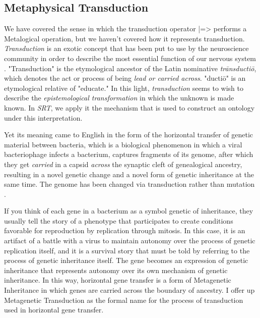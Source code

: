 \documentclass[runningheads]{llncs}
\begin{document}

\subsection{Metaphysical Transduction}

We have covered the sense in which the transduction operator |=> performs a Metalogical operation, but we haven't covered how it represents transduction. \emph{Transduction} is an exotic concept that has been put to use by the neuroscience community in order to describe the most essential function of our nervous system \cite{Hagins1970}. "Transduction" is the etymological ancestor of the Latin nominative \emph{trānsductiō}, which denotes the act or process of being \emph{lead or carried across}. "ductiō" is an etymological relative of "educate." In this light, \emph{transduction} seems to wish to describe the \emph{epistemological transformation} in which the unknown is made known. In \emph{SRT}, we apply it the mechanism that is used to construct an ontology under this interpretation. 


Yet its meaning came to English in the form of the horizontal transfer of genetic material between bacteria, which is a biological phenomenon in which a viral bacteriophage infects a bacterium, captures fragments of its genome, after which they get \emph{carried} in a capsid \emph{across} the synaptic cleft of genealogical ancestry, resulting in a novel genetic change and a novel form of genetic inheritance at the same time. The genome has been changed via transduction rather than mutation \cite{Zinder1952}.

If you think of each gene in a bacterium as a symbol genetic of inheritance, they usually tell the story of a phenotype that participates to create conditions favorable for reproduction by replication through mitosis. In this case, it is an artifact of a battle with a virus to maintain autonomy over the process of genetic replication itself, and it is a survival story that must be told by referring to the process of genetic inheritance itself. The gene becomes an expression of genetic inheritance that represents autonomy over its own mechanism of genetic inheritance. In this way, horizontal gene transfer is a form of Metagenetic Inheritance in which genes are carried across the boundary of ancestry. I offer up Metagenetic Transduction as the formal name for the process of transduction used in horizontal gene transfer.     
\end{document}
